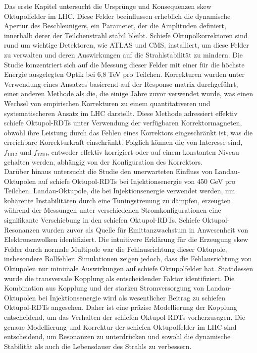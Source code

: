{%
Das erste Kapitel untersucht die Ursprünge und Konsequenzen skew Oktupolfelder im LHC. Diese
Felder beeinflussen erheblich die dynamische Apertur des Beschleunigers, ein Parameter, der die
Amplituden definiert, innerhalb derer der Teilchenstrahl stabil bleibt. Schiefe Oktupolkorrektoren
sind rund um wichtige Detektoren, wie ATLAS und CMS, installiert, um diese Felder zu verwalten und
deren Auswirkungen auf die Strahlstabilität zu mindern. Die Studie konzentriert sich auf die Messung
dieser Felder mit einer für die höchste Energie ausgelegten Optik bei 6,8 TeV pro Teilchen.
Korrekturen wurden unter Verwendung eines Ansatzes basierend auf der Response-matrix durchgeführt,
einer anderen Methode als die, die einige Jahre zuvor verwendet wurde, was einen Wechsel von
empirischen Korrekturen zu einem quantitativeren und systematischeren Ansatz im LHC darstellt. 
Diese Methode adressiert effektiv schiefe Oktupol-RDTs unter Verwendung der verfügbaren
Korrektormagneten, obwohl ihre Leistung durch das Fehlen eines Korrektors eingeschränkt ist, was die
erreichbare Korrekturkraft einschränkt. Folglich können die von Interesse sind, $f_{1012}$ und
$f_{1210}$, entweder effektiv korrigiert oder auf einem konstanten Niveau gehalten werden, abhängig
von der Konfiguration des Korrektors.
\\
\indent
Darüber hinaus untersucht die Studie den unerwarteten Einfluss von Landau-Oktupolen auf
schiefe Oktupol-RDTs bei Injektionsenergie von 450 GeV pro Teilchen. Landau-Oktupole, die bei
Injektionsenergie verwendet werden, um kohärente Instabilitäten durch eine Tuningstreuung zu
dämpfen, erzeugten während der Messungen unter verschiedenen Stromkonfigurationen eine signifikante
Verschiebung in den schiefen Oktupol-RDTs. Schiefe Oktupol-Resonanzen wurden zuvor als Quelle für
Emittanzwachstum in Anwesenheit von Elektronenwolken identifiziert. Die intuitivere Erklärung für
die Erzeugung skew Felder durch normale Multipole war die Fehlausrichtung dieser Oktupole,
insbesondere Rollfehler. Simulationen zeigen jedoch, dass die Fehlausrichtung von Oktupolen nur
minimale Auswirkungen auf schiefe Oktupolfelder hat. Stattdessen wurde die transversale Kopplung als
entscheidender Faktor identifiziert. Die Kombination aus Kopplung und der starken Stromversorgung
von Landau-Oktupolen bei Injektionsenergie wird als wesentlicher Beitrag zu schiefen Oktupol-RDTs
angesehen. Daher ist eine präzise Modellierung der Kopplung entscheidend, um das Verhalten der
schiefen Oktupol-RDTs vorherzusagen. Die genaue Modellierung und Korrektur der schiefen
Oktupolfelder im LHC sind entscheidend, um Resonanzen zu unterdrücken und sowohl die dynamische
Stabilität als auch die Lebensdauer des Strahls zu verbessern.

}
